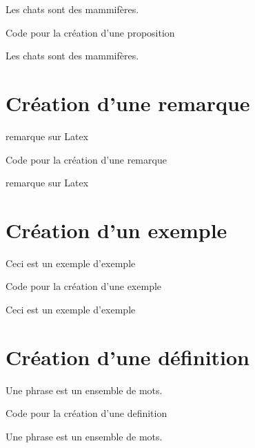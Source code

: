 \begin{proposition}
    Les chats sont des mammifères.
\end{proposition}

\begin{Latex}{Code pour la création d'une proposition}
\begin{proposition}
    Les chats sont des mammifères.
\end{proposition}
\end{Latex}

\section{Création d'une remarque}

\begin{remarque}
remarque sur Latex
\end{remarque}

\begin{Latex}{Code pour la création d'une remarque}
\begin{remarque}
remarque sur Latex
\end{remarque}
\end{Latex}

\section{Création d'un exemple}

\begin{exemple}
    Ceci est un exemple d'exemple
\end{exemple}

\begin{Latex}{Code pour la création d'une exemple}
\begin{exemple}
    Ceci est un exemple d'exemple
\end{exemple}
\end{Latex}

\section{Création d'une définition}

\begin{definition}
    Une phrase est un ensemble de mots.
\end{definition}

\begin{Latex}{Code pour la création d'une definition}
\begin{definition}
    Une phrase est un ensemble de mots.
\end{definition}
\end{Latex}

